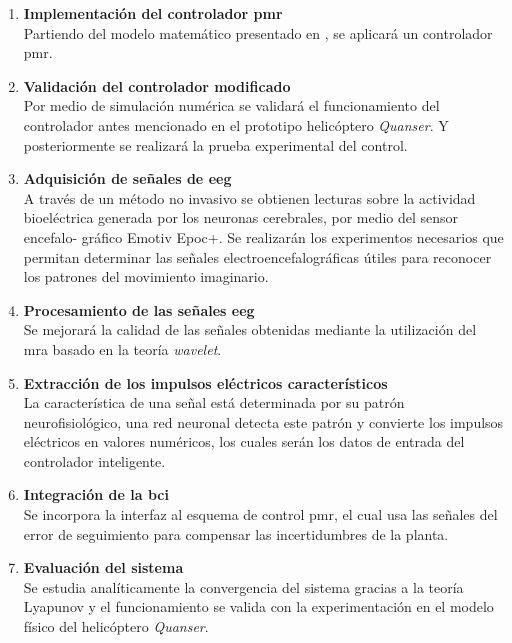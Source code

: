     \begin{enumerate}[noitemsep, nolistsep, leftmargin = 15mm, label = \alph*)]
        \item \textbf{Implementación del controlador \acrlong{pmr}}\\Partiendo del modelo matemático presentado en \cite{GarciaCastro2020}, se aplicará un controlador \acrlong{pmr}.
        
        \item \textbf{Validación del controlador modificado}\\Por medio de simulación numérica se validará el funcionamiento del controlador antes mencionado en el prototipo helicóptero \textit{Quanser}. Y posteriormente se realizará la prueba experimental del control.
        
        \item \textbf{Adquisición de señales de \acrfull{eeg}}\\A través de un método no invasivo se obtienen lecturas sobre la actividad bioeléctrica generada por los neuronas cerebrales,  por medio del sensor encefalo- gráfico Emotiv Epoc+\textregistered. Se realizarán los experimentos necesarios que permitan determinar las señales electroencefalográficas útiles para reconocer los patrones del movimiento imaginario.
        
        \item \textbf{Procesamiento de las señales \acrshort{eeg}}\\Se mejorará la calidad de las señales obtenidas mediante la utilización del \acrlong{mra} basado en la teoría \textit{wavelet}.
        
        \item \textbf{Extracción de los impulsos eléctricos característicos}\\La característica de una señal está determinada por su patrón neurofisiológico, una red neuronal detecta este patrón y convierte los impulsos eléctricos en valores numéricos, los cuales serán los datos de entrada del controlador inteligente.
        
        \item \textbf{Integración de la \acrlong{bci}}\\Se incorpora la interfaz al esquema de control \acrlong{pmr}, el cual usa las señales del error de seguimiento para compensar las incertidumbres de la planta.
        
        \item \textbf{Evaluación del sistema}\\Se estudia analíticamente la convergencia del sistema gracias a la teoría Lyapunov y el funcionamiento se valida con la experimentación en el modelo físico del helicóptero \textit{Quanser}.
        

\end{enumerate}
